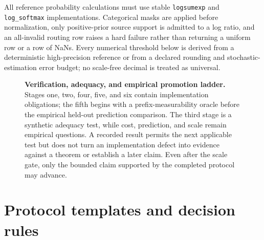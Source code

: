 All reference probability calculations must use stable \texttt{logsumexp} and \texttt{log\_softmax} implementations. Categorical masks are applied before normalization, only positive-prior source support is admitted to a log ratio, and an all-invalid routing row raises a hard failure rather than returning a uniform row or a row of NaNs. Every numerical threshold below is derived from a deterministic high-precision reference or from a declared rounding and stochastic-estimation error budget; no scale-free decimal is treated as universal.

\begin{figure}[htbp]
\centering
\resizebox{0.72\textwidth}{!}{}
\caption{%
\textbf{Verification, adequacy, and empirical promotion ladder.}
Stages one, two, four, five, and six contain implementation obligations; the fifth begins with a prefix-measurability oracle before the empirical held-out prediction comparison. The third stage is a synthetic adequacy test, while cost, prediction, and scale remain empirical questions. A recorded result permits the next applicable test but does not turn an implementation defect into evidence against a theorem or establish a later claim. Even after the scale gate, only the bounded claim supported by the completed protocol may advance.
}
\label{fig:vfe4-validation-ladder}
\end{figure}
\clearpage

\section{Protocol templates and decision rules}


